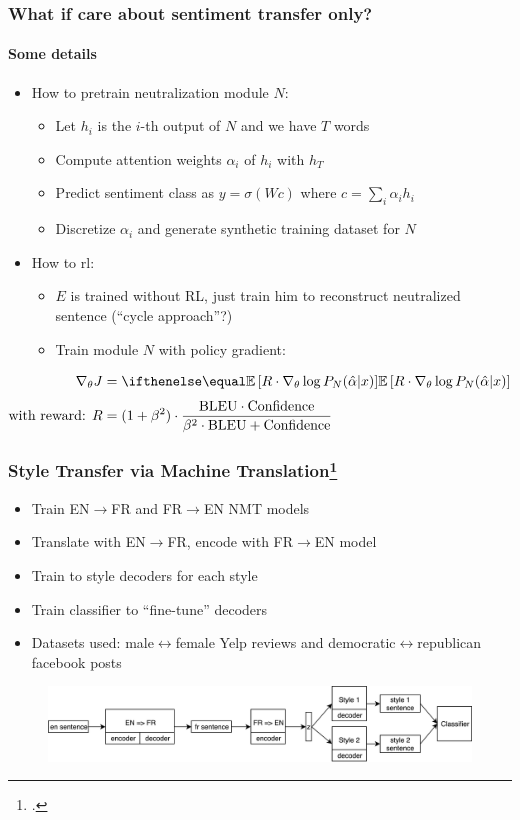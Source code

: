\documentclass[10pt]{beamer}
\begin{document}
\begin{frame}
\frametitle{What if care about sentiment transfer only?}
\framesubtitle{Some details}
\begin{itemize}
    \item How to pretrain neutralization module $N$:
    \begin{itemize}
        \item Let $h_i$ is the $i$-th output of $N$ and we have $T$ words
        \item Compute attention weights $\alpha_i$ of $h_i$ with $h_T$
        \item Predict sentiment class as $y = \sigma(Wc)$ where $c = \sum_i \alpha_i h_i$
        \item Discretize $\alpha_i$ and generate synthetic training dataset for $N$
    \end{itemize}
    \item How to rl:
    \begin{itemize}
        \item $E$ is trained without RL, just train him to reconstruct neutralized sentence (``cycle approach''?)
        \item Train module $N$ with policy gradient:
\end{itemize}
\end{itemize}
\begin{equation*}
\begin{split}
\nabla_\theta J & = \expect{R \cdot \nabla_\theta \log P_N(\hat{\alpha} | x)} \\
\text{with reward: } R & = (1 + \beta^2) \cdot \frac{\text{BLEU} \cdot \text{Confidence}}{\beta^2 \cdot \text{BLEU} + \text{Confidence}}
\end{split}
\end{equation*}
\end{frame}


\begin{frame}
\frametitle{Style Transfer via Machine Translation\footcite{StyleTransferViaBackTranslation}}
\begin{itemize}
    \item Train EN$\to$FR and FR$\to$EN NMT models
    \item Translate with EN$\to$FR, encode with FR$\to$EN model
    \item Train to style decoders for each style
    \item Train classifier to ``fine-tune'' decoders
    \item Datasets used: male$\leftrightarrow$female Yelp reviews and democratic$\leftrightarrow$republican facebook posts
\end{itemize}

\begin{figure}
\centering
\includegraphics[width=\textwidth]{images/style-transfer-via-mt.png}
\end{figure}
\end{frame}
\end{document}
